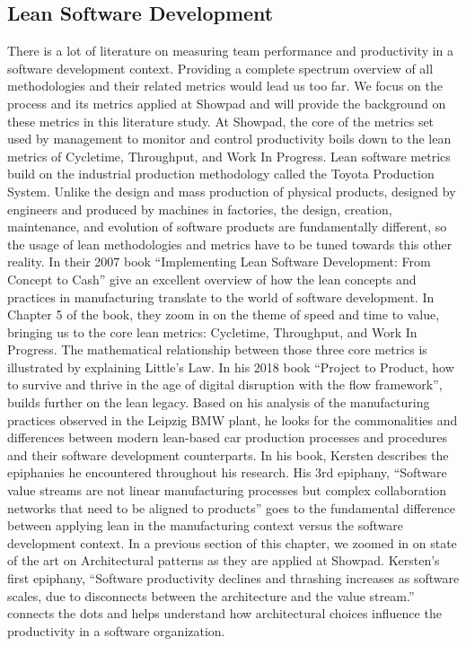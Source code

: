 \subsection{Lean Software Development}
There is a lot of literature on measuring team performance and productivity in a software development context. Providing a complete spectrum overview of all methodologies and their related metrics would lead us too far. We focus on the process and its metrics applied at Showpad and will provide the background on these metrics in this literature study.
At Showpad, the core of the metrics set used by management to monitor and control productivity boils down to the lean metrics of \gls{Cycletime}, Throughput, and Work In Progress. 
\newline
\newline
Lean software metrics build on the industrial production methodology called the Toyota Production System. Unlike the design and mass production of physical products, designed by engineers and produced by machines in factories, the design, creation, maintenance, and evolution of software products are fundamentally different, so the usage of lean methodologies and metrics have to be tuned towards this other reality.
\newline
\newline
In their 2007 book ``Implementing Lean Software Development: From Concept to Cash''   give an excellent overview of how the lean concepts and practices in manufacturing translate to the world of software development. In Chapter 5 of the book, they zoom in on the theme of speed and time to value, bringing us to the core lean metrics: \gls{Cycletime}, Throughput, and Work In Progress. The mathematical relationship between those three core metrics is illustrated by explaining Little's Law.
\newline
\newline
In his  2018 book ``Project to Product, how to survive and thrive in the age of digital disruption with the flow framework'',  builds further on the lean legacy. Based on his analysis of the manufacturing practices observed in the Leipzig BMW plant, he looks for the commonalities and differences between modern lean-based car production processes and procedures and their software development counterparts. In his book, Kersten describes the epiphanies he encountered throughout his research. His 3rd epiphany, ``Software value streams are not linear manufacturing processes but complex collaboration networks that need to be aligned to products'' goes to the fundamental difference between applying lean in the manufacturing context versus the software development context. In a previous section of this chapter, we zoomed in on state of the art on Architectural patterns as they are applied at Showpad. Kersten's first epiphany, ``Software productivity declines and thrashing increases as software scales, due to disconnects between the architecture and the value stream.'' connects the dots and helps understand how architectural choices influence the productivity in a software organization.
